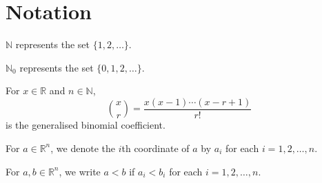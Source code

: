 \section{Notation}

$\mathbb{N}$ represents the set $\{1,2,\ldots\}$.

\vspace{1mm}
$\mathbb{N}_0$ represents the set $\{0,1,2,\ldots\}$.

\vspace{1mm}
For $x\in\mathbb{R}$ and $n\in\mathbb{N}$,
$$\binom{x}{r}=\frac{x(x-1)\cdots(x-r+1)}{r!}$$
is the generalised binomial coefficient.

\vspace{1mm}
For $a\in\mathbb{R}^n$, we denote the $i$th coordinate of $a$ by $a_i$ for each $i=1,2,\ldots,n$.

\vspace{1mm}
For $a,b\in\mathbb{R}^n$, we write $a<b$ if $a_i<b_i$ for each $i=1,2,\ldots,n$.

\clearpage